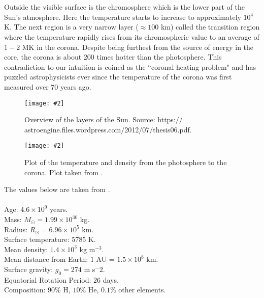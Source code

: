 \documentclass[12pt]{ociamthesis}
\newcommand{\mfig}[4]{
  \begin{figure}
  \begin{center}
  \texttt{[image: \#2]}
  \caption{#3}
  \label{#4}
  \end{center}
  \end{figure}}
\begin{document}
\\ \\ Outside the visible surface is the chromosphere which is the lower part of the Sun's atmosphere. Here the temperature starts to increase to approximately $10^4$ K. The next region is a very narrow layer ($\approx 100$ km) called the transition region where the temperature rapidly rises from its chromospheric value to an average of $1-2$ MK in the corona. Despite being furthest from the source of energy in the core, the corona is about 200 times hotter than the photosphere. This contradiction to our intuition is coined as the ``coronal heating problem" and has puzzled astrophysicists ever since the temperature of the corona was first measured over 70 years ago.   
\mfig{0.8}{figures/on.png}{Overview of the layers of the Sun. Source: https:$//$astroengine.files.wordpress.com$/$2012$/$07$/$thesis06.pdf.}{on_model}
\mfig{0.725}{figures/T_regoins}{Plot of the temperature and density from the photosphere to the corona. Plot taken from \cite{Lang_2006ses}.}{t_profile_sun}
The values below are taken from \citep{priest2014magnetohydrodynamics}.  \\ \\
Age: $4.6 \times 10^9$ years. \\
Mass: $M_{\odot}= 1.99 \times 10^{30}$ kg. \\
Radius: $R_{\odot} = 6.96 \times 10^5$ km. \\
Surface temperature: $5785$ K. \\
Mean density: $1.4 \times 10^3$ kg m$^{-3}$. \\
Mean distance from Earth: $1$ AU = $1.5 \times 10^8$ km. \\
Surface gravity: $g_{0}=274$ m s$^-2$. \\
Equatorial Rotation Period: $26$ days. \\
Composition: $90 \%$ H, $10 \%$ He, $0.1 \%$ other elements.    
\end{document}
